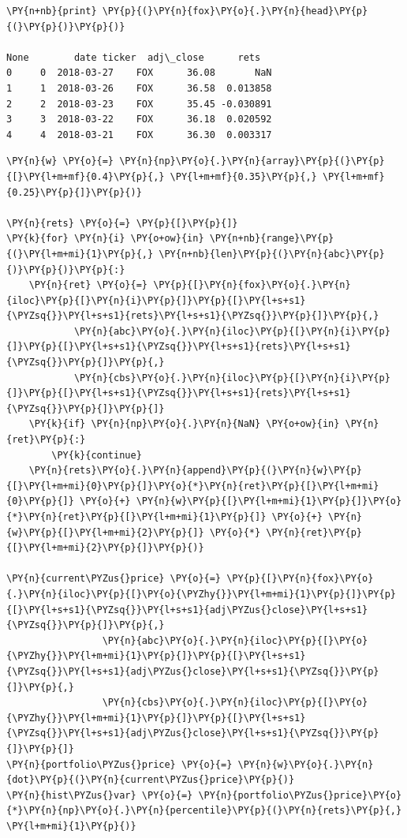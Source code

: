 \begin{Answer}
\begin{tcolorbox}[size=fbox, boxrule=1pt, colback=cellbackground, colframe=cellborder]
\begin{Verbatim}[commandchars=\\\{\}]
\PY{n+nb}{print} \PY{p}{(}\PY{n}{fox}\PY{o}{.}\PY{n}{head}\PY{p}{(}\PY{p}{)}\PY{p}{)}

None        date ticker  adj\_close      rets
0     0  2018-03-27    FOX      36.08       NaN
1     1  2018-03-26    FOX      36.58  0.013858
2     2  2018-03-23    FOX      35.45 -0.030891
3     3  2018-03-22    FOX      36.18  0.020592
4     4  2018-03-21    FOX      36.30  0.003317
\end{Verbatim}
\end{tcolorbox}

\begin{tcolorbox}[size=fbox, boxrule=1pt, colback=cellbackground, colframe=cellborder]
\begin{Verbatim}[commandchars=\\\{\}]
\PY{n}{w} \PY{o}{=} \PY{n}{np}\PY{o}{.}\PY{n}{array}\PY{p}{(}\PY{p}{[}\PY{l+m+mf}{0.4}\PY{p}{,} \PY{l+m+mf}{0.35}\PY{p}{,} \PY{l+m+mf}{0.25}\PY{p}{]}\PY{p}{)}
		
\PY{n}{rets} \PY{o}{=} \PY{p}{[}\PY{p}{]}
\PY{k}{for} \PY{n}{i} \PY{o+ow}{in} \PY{n+nb}{range}\PY{p}{(}\PY{l+m+mi}{1}\PY{p}{,} \PY{n+nb}{len}\PY{p}{(}\PY{n}{abc}\PY{p}{)}\PY{p}{)}\PY{p}{:}
    \PY{n}{ret} \PY{o}{=} \PY{p}{[}\PY{n}{fox}\PY{o}{.}\PY{n}{iloc}\PY{p}{[}\PY{n}{i}\PY{p}{]}\PY{p}{[}\PY{l+s+s1}{\PYZsq{}}\PY{l+s+s1}{rets}\PY{l+s+s1}{\PYZsq{}}\PY{p}{]}\PY{p}{,}
            \PY{n}{abc}\PY{o}{.}\PY{n}{iloc}\PY{p}{[}\PY{n}{i}\PY{p}{]}\PY{p}{[}\PY{l+s+s1}{\PYZsq{}}\PY{l+s+s1}{rets}\PY{l+s+s1}{\PYZsq{}}\PY{p}{]}\PY{p}{,}
            \PY{n}{cbs}\PY{o}{.}\PY{n}{iloc}\PY{p}{[}\PY{n}{i}\PY{p}{]}\PY{p}{[}\PY{l+s+s1}{\PYZsq{}}\PY{l+s+s1}{rets}\PY{l+s+s1}{\PYZsq{}}\PY{p}{]}\PY{p}{]}
    \PY{k}{if} \PY{n}{np}\PY{o}{.}\PY{n}{NaN} \PY{o+ow}{in} \PY{n}{ret}\PY{p}{:}
        \PY{k}{continue}
    \PY{n}{rets}\PY{o}{.}\PY{n}{append}\PY{p}{(}\PY{n}{w}\PY{p}{[}\PY{l+m+mi}{0}\PY{p}{]}\PY{o}{*}\PY{n}{ret}\PY{p}{[}\PY{l+m+mi}{0}\PY{p}{]} \PY{o}{+} \PY{n}{w}\PY{p}{[}\PY{l+m+mi}{1}\PY{p}{]}\PY{o}{*}\PY{n}{ret}\PY{p}{[}\PY{l+m+mi}{1}\PY{p}{]} \PY{o}{+} \PY{n}{w}\PY{p}{[}\PY{l+m+mi}{2}\PY{p}{]} \PY{o}{*} \PY{n}{ret}\PY{p}{[}\PY{l+m+mi}{2}\PY{p}{]}\PY{p}{)}
			
\PY{n}{current\PYZus{}price} \PY{o}{=} \PY{p}{[}\PY{n}{fox}\PY{o}{.}\PY{n}{iloc}\PY{p}{[}\PY{o}{\PYZhy{}}\PY{l+m+mi}{1}\PY{p}{]}\PY{p}{[}\PY{l+s+s1}{\PYZsq{}}\PY{l+s+s1}{adj\PYZus{}close}\PY{l+s+s1}{\PYZsq{}}\PY{p}{]}\PY{p}{,} 
                 \PY{n}{abc}\PY{o}{.}\PY{n}{iloc}\PY{p}{[}\PY{o}{\PYZhy{}}\PY{l+m+mi}{1}\PY{p}{]}\PY{p}{[}\PY{l+s+s1}{\PYZsq{}}\PY{l+s+s1}{adj\PYZus{}close}\PY{l+s+s1}{\PYZsq{}}\PY{p}{]}\PY{p}{,}
                 \PY{n}{cbs}\PY{o}{.}\PY{n}{iloc}\PY{p}{[}\PY{o}{\PYZhy{}}\PY{l+m+mi}{1}\PY{p}{]}\PY{p}{[}\PY{l+s+s1}{\PYZsq{}}\PY{l+s+s1}{adj\PYZus{}close}\PY{l+s+s1}{\PYZsq{}}\PY{p}{]}\PY{p}{]}
\PY{n}{portfolio\PYZus{}price} \PY{o}{=} \PY{n}{w}\PY{o}{.}\PY{n}{dot}\PY{p}{(}\PY{n}{current\PYZus{}price}\PY{p}{)}
\PY{n}{hist\PYZus{}var} \PY{o}{=} \PY{n}{portfolio\PYZus{}price}\PY{o}{*}\PY{n}{np}\PY{o}{.}\PY{n}{percentile}\PY{p}{(}\PY{n}{rets}\PY{p}{,} \PY{l+m+mi}{1}\PY{p}{)}


\end{Verbatim}
\end{tcolorbox}
\end{Answer}
